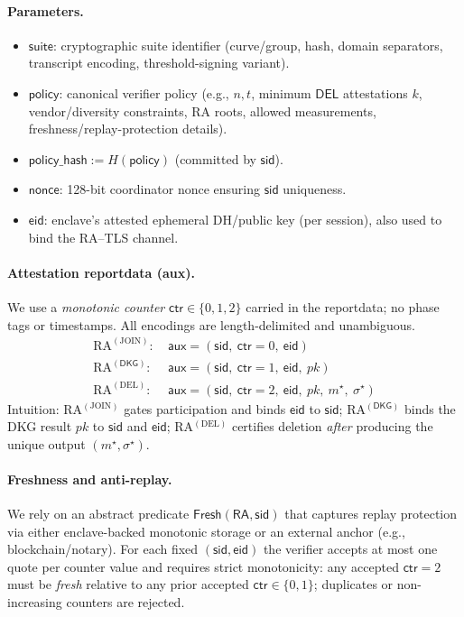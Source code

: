 \documentclass[runningheads,orivec]{llncs}
\begin{document}
\paragraph{Parameters.}
\begin{itemize}[leftmargin=*,itemsep=0.25em]
  \item $\mathsf{suite}$: cryptographic suite identifier (curve/group, hash, domain separators, transcript encoding, threshold-signing variant).
  \item $\mathsf{policy}$: canonical verifier policy (e.g., $n,t$, minimum $\mathsf{DEL}$ attestations $k$, vendor/diversity constraints, RA roots, allowed measurements, freshness/replay-protection details).
  \item $\mathsf{policy\_hash} := H(\mathsf{policy})$ (committed by $\mathsf{sid}$).
  \item $\mathsf{nonce}$: 128-bit coordinator nonce ensuring $\mathsf{sid}$ uniqueness.
  \item $\mathsf{eid}$: enclave’s attested ephemeral DH/public key (per session), also used to bind the RA–TLS channel.
\end{itemize}

\paragraph{Attestation reportdata (aux).}
We use a \emph{monotonic counter} $\mathsf{ctr}\in\{0,1,2\}$ carried in the reportdata; no phase tags or timestamps.
All encodings are length-delimited and unambiguous.
\begin{align*}
  \text{RA}^{(\mathrm{JOIN})}\!:\ & \mathsf{aux} = (\mathsf{sid},\ \mathsf{ctr}{=}0,\ \mathsf{eid}) \\
  \text{RA}^{(\mathsf{DKG})}\!:\ & \mathsf{aux} = (\mathsf{sid},\ \mathsf{ctr}{=}1,\ \mathsf{eid},\ pk) \\
  \text{RA}^{(\mathrm{DEL})}\!:\ & \mathsf{aux} = (\mathsf{sid},\ \mathsf{ctr}{=}2,\ \mathsf{eid},\ pk,\ m^{\star},\ \sigma^{\star})
\end{align*}
Intuition: RA$^{(\mathrm{JOIN})}$ gates participation and binds $\mathsf{eid}$ to $\mathsf{sid}$; RA$^{(\mathsf{DKG})}$ binds the DKG result $pk$ to $\mathsf{sid}$ and $\mathsf{eid}$;
RA$^{(\mathrm{DEL})}$ certifies deletion \emph{after} producing the unique output $(m^{\star},\sigma^{\star})$.

\paragraph{Freshness and anti-replay.}
We rely on an abstract predicate $\textsf{Fresh}(\mathsf{RA},\mathsf{sid})$ that captures replay protection via either enclave-backed monotonic storage
or an external anchor (e.g., blockchain/notary). For each fixed $(\mathsf{sid},\mathsf{eid})$ the verifier accepts at most one quote per counter value and requires
strict monotonicity: any accepted $\mathsf{ctr}{=}2$ must be \emph{fresh} relative to any prior accepted $\mathsf{ctr}{\in}\{0,1\}$; duplicates or non-increasing counters are rejected.
\end{document}
